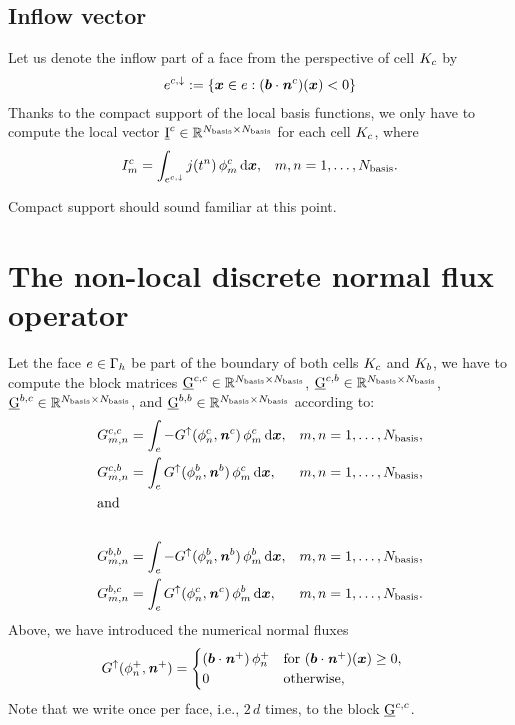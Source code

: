 \documentclass{scrreprt}
\begin{document}
\subsection{Inflow vector}
Let us denote the inflow part of a face from the perspective of cell $K_c$
by
\begin{align}
e^{c,\downarrow} := \{ {\boldsymbol x} \in e : ({\boldsymbol b} \cdot
{\boldsymbol {\mathit{n}}}^{{c}})({\boldsymbol x}) < 0\}
\end{align}
Thanks to the compact support of the local basis functions, we only
have to compute the local vector $\underline{\mathrm{I}}^{c} \in \mathbb{R}^{N_\textup{basis}
\times N_\textup{basis}}$ for each cell $K_c$, where
\begin{align}
I^{c}_{m} =
\int_{e^{c,\downarrow}}
j(t^n)\,\phi^{c}_{m} \, \text{d}{\boldsymbol x},
 && m,n = 1,\ldots,N_\textup{basis}.
\end{align}
\begin{remark}
Compact support
\rm {should sound familiar at this point.}
\end{remark}
\section{The non-local discrete normal flux operator}
Let the face $e \in \Gamma_h$ be part of the boundary of both
cells $K_c$ and $K_b$, we have to compute the block matrices
$\underline{\mathrm{G}}^{c,c} \in \mathbb{R}^{N_\textup{basis} \times N_\textup{basis}}$,
$\underline{\mathrm{G}}^{c,b} \in \mathbb{R}^{N_\textup{basis} \times N_\textup{basis}}$,
$\underline{\mathrm{G}}^{b,c} \in \mathbb{R}^{N_\textup{basis} \times N_\textup{basis}}$,
and
$\underline{\mathrm{G}}^{b,b} \in \mathbb{R}^{N_\textup{basis} \times N_\textup{basis}}$
according to:
\begin{align}
{G}^{c,c}_{m,n} &=
\int_{e}
-
G^{\uparrow}(\phi^{c}_{n},{\boldsymbol {\mathit{n}}}^{{c}})\,
\phi^{c}_{m} \, \text{d}{\boldsymbol x},
&& m,n = 1,\ldots,N_\textup{basis},
\\
{G}^{c,b}_{m,n} &=
\int_{e}
G^{\uparrow}(\phi^{b}_{n},{\boldsymbol {\mathit{n}}}^{{b}})\,
\phi^{c}_{m} \, \text{d}{\boldsymbol x},
&& m,n = 1,\ldots,N_\textup{basis},
\\
\intertext{and}
\\
{G}^{b,b}_{m,n} &=
\int_{e}
-
G^{\uparrow}(\phi^{b}_{n},{\boldsymbol {\mathit{n}}}^{{b}})\,
\phi^{b}_{m} \, \text{d}{\boldsymbol x},
&& m,n = 1,\ldots,N_\textup{basis},
\\
{G}^{b,c}_{m,n} &=
\int_{e}
G^{\uparrow}(\phi^{c}_{n},{\boldsymbol {\mathit{n}}}^{{c}})\,\phi^{b}_{m} \, \text{d}{\boldsymbol x},
&& m,n = 1,\ldots,N_\textup{basis}. 
\end{align}
Above, we have introduced the numerical normal fluxes
\begin{align} 
G^{\uparrow}(\phi^{+}_{n},{\boldsymbol {\mathit{n}}}^{+})
&=
\begin{cases}
({\boldsymbol b} \cdot {\boldsymbol {\mathit{n}}}^{+})\,\phi^{+}_{n}
& \textup{for }
({\boldsymbol b} \cdot {\boldsymbol {\mathit{n}}}^{+})({\boldsymbol x}) \geq 0, 
\\
0                & \textup{otherwise},
\end{cases}
\end{align}
Note that we write once per face, i.e., $2\,d$ times, to the block
$\underline{\mathrm{G}}^{c,c}$.
\end{document}
